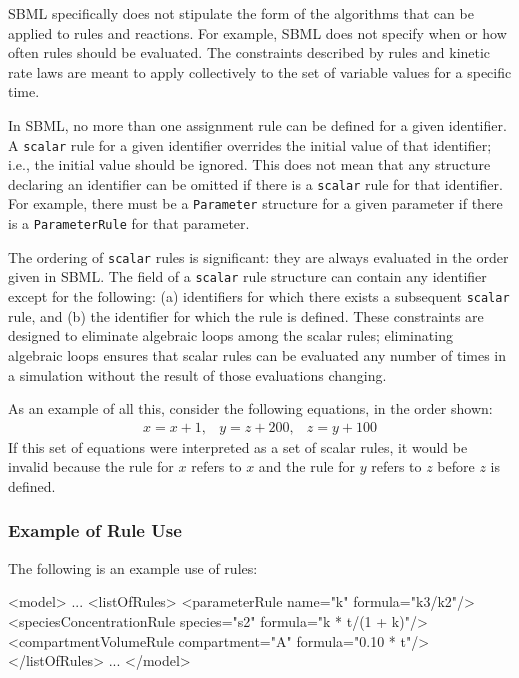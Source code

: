 \documentclass[10pt]{cekarticle}
\newenvironment{blockChanged}{\color{BrickRed}}{}
\begin{document}
\begin{blockChanged}
SBML specifically does not stipulate the form of the algorithms that can be
applied to rules and reactions.  For example, SBML does not specify when or
how often rules should be evaluated.  The constraints described by rules
and kinetic rate laws are meant to apply collectively to the set of
variable values for a specific time.

In SBML, no more than one assignment rule can be defined for a given
identifier.  A \texttt{scalar} rule for a given identifier overrides the
initial value of that identifier; i.e., the initial value should be
ignored.  This does not mean that any structure declaring an identifier can
be omitted if there is a \texttt{scalar} rule for that identifier.  For
example, there must be a \texttt{Parameter} structure for a given parameter
if there is a \texttt{ParameterRule} for that parameter.

The ordering of \texttt{scalar} rules is significant: they are always
evaluated in the order given in SBML.  The  field of a
\texttt{scalar} rule structure can contain any identifier except for the
following: (a) identifiers for which there exists a subsequent
\texttt{scalar} rule, and (b) the identifier for which the rule is defined.
These constraints are designed to eliminate algebraic loops among the
scalar rules; eliminating algebraic loops ensures that scalar rules can be
evaluated any number of times in a simulation without the result of those
evaluations changing.

As an example of all this, consider the following equations, in the order
shown:
\begin{equation*}
  \begin{array}{lll}
    x = x + 1, & y = z + 200, & z = y + 100
  \end{array}
\end{equation*}
If this set of equations were interpreted as a set of scalar rules, it
would be invalid because the rule for $x$ refers to $x$ and the rule for
$y$ refers to $z$ before $z$ is defined.
\end{blockChanged}


\subsubsection{Example of Rule Use}

The following is an example use of rules:

\begin{example}
<model>
    ...
    <listOfRules>
        <parameterRule name="k" formula="k3/k2"/>
        <speciesConcentrationRule species="s2" formula="k * t/(1 + k)"/>
        <compartmentVolumeRule compartment="A" formula="0.10 * t"/>
    </listOfRules>
    ...
</model> 
\end{example}
\end{document}
